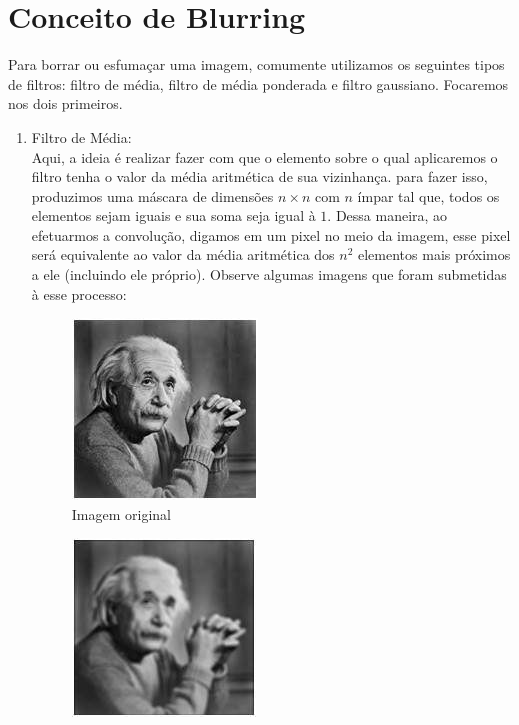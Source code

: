 \documentclass[a4paper, 12pt]{article}
\begin{document}
\section{Conceito de Blurring}
Para borrar ou esfumaçar uma imagem, comumente utilizamos os seguintes tipos de filtros: filtro de média, filtro de média ponderada e filtro gaussiano. 
Focaremos nos dois primeiros.
\\
\begin{enumerate}
	\item Filtro de Média:
	\\
	Aqui, a ideia é realizar fazer com que o elemento sobre o qual aplicaremos o filtro tenha o valor da média aritmética de sua vizinhança.
	para fazer isso, produzimos uma máscara de dimensões $n \times n$ com $n$ ímpar tal que, todos os elementos sejam iguais e sua soma seja igual à 
	$1$. Dessa maneira, ao efetuarmos a convolução, digamos em um pixel no meio da imagem, esse pixel será equivalente ao 
	valor da média aritmética dos $n^2$ elementos mais próximos a ele (incluindo ele próprio). Observe algumas imagens que foram submetidas à esse processo:
	\\
	\begin{figure}[!htb]
		\centering
		\includegraphics[scale=0.62]{images/einstein256.jpg}
		\caption{Imagem original}
	\end{figure}
	\begin{figure}[!htb]
		\centering
		  \includegraphics[width=\linewidth]{images/borrado5.jpg}

\end{figure}
\end{enumerate}
\end{document}
